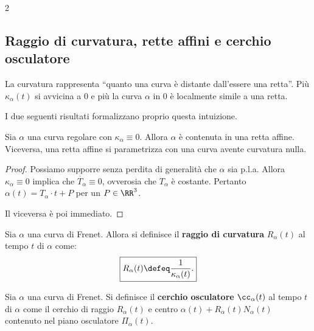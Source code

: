 \begin{multicols*}{2}
    \subsection{Raggio di curvatura, rette affini e cerchio osculatore}

    La curvatura rappresenta ``quanto una curva è distante dall'essere una retta''.
    Più $\kappa_\alpha(t)$ si avvicina a $0$ e più la curva $\alpha$ in $0$ è localmente
    simile a una retta. \smallskip

    I due seguenti risultati formalizzano proprio questa intuizione.

    \begin{proposition}
        Sia $\alpha$ una curva regolare con $\kappa_\alpha \equiv 0$. Allora
        $\alpha$ è contenuta in una retta affine. Viceversa, una retta affine
        si parametrizza con una curva avente curvatura nulla.
    \end{proposition}

    \begin{proof}
        Possiamo supporre senza perdita di generalità che $\alpha$ sia p.l.a. Allora
        $\kappa_\alpha \equiv 0$ implica che $\dot{T_\alpha} \equiv 0$, ovverosia
        che $T_\alpha$ è costante. Pertanto $\alpha(t) = T_\alpha \cdot t + P$ per un
        $P \in \RR^3$. \smallskip

        Il viceversa è poi immediato.
    \end{proof}

    \begin{definition}
        Sia $\alpha$ una curva di Frenet. Allora si definisce il
        \textbf{raggio di curvatura} $R_\alpha(t)$ al tempo $t$ di $\alpha$
        come:
        \[
            \boxed{R_\alpha(t) \defeq \frac{1}{\kappa_\alpha(t)}.}
        \]
    \end{definition}

    \begin{definition}
        Sia $\alpha$ una curva di Frenet. Si definisce il
        \textbf{cerchio osculatore} $\cc_\alpha(t)$ al tempo $t$ di $\alpha$ come
        il cerchio di raggio $R_\alpha(t)$ e centro $\alpha(t) + R_\alpha(t) N_\alpha(t)$ contenuto
        nel piano osculatore $\Pi_\alpha(t)$.
    \end{definition}


\end{multicols*}
